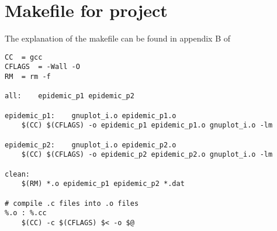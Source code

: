\documentclass[a4paper,11pt]{article}
\begin{document}
\section{Makefile for project}
The explanation of the makefile can be found in appendix B of \cite{cmanual}
\begin{lstlisting}
CC 	= gcc
CFLAGS 	= -Wall -O
RM	= rm -f

all:	epidemic_p1 epidemic_p2 

epidemic_p1:	gnuplot_i.o epidemic_p1.o
	$(CC) $(CFLAGS) -o epidemic_p1 epidemic_p1.o gnuplot_i.o -lm

epidemic_p2:	gnuplot_i.o epidemic_p2.o
	$(CC) $(CFLAGS) -o epidemic_p2 epidemic_p2.o gnuplot_i.o -lm

clean:
	$(RM) *.o epidemic_p1 epidemic_p2 *.dat

# compile .c files into .o files
%.o : %.cc
	$(CC) -c $(CFLAGS) $< -o $@
\end{lstlisting}
\end{document}
